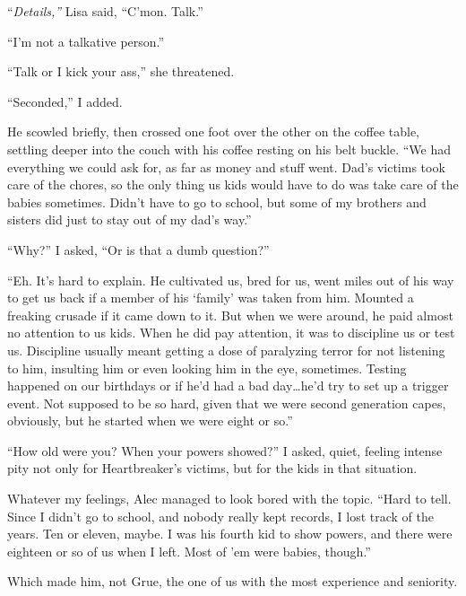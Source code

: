 ``\emph{Details,'' }Lisa said, ``C'mon.  Talk.''



``I'm not a talkative person.''



``Talk or I kick your ass,'' she threatened.



``Seconded,'' I added.



He scowled briefly, then crossed one foot over the other on the coffee table, settling deeper into the couch with his coffee resting on his belt buckle.  ``We had everything we could ask for, as far as money and stuff went.  Dad's victims took care of the chores, so the only thing us kids would have to do was take care of the babies sometimes.  Didn't have to go to school, but some of my brothers and sisters did just to stay out of my dad's way.''



``Why?'' I asked, ``Or is that a dumb question?''



``Eh.  It's hard to explain.  He cultivated us, bred for us, went miles out of his way to get us back if a member of his `family' was taken from him.  Mounted a freaking crusade if it came down to it.  But when we were around, he paid almost no attention to us kids.  When he did pay attention, it was to discipline us or test us.  Discipline usually meant getting a dose of paralyzing terror for not listening to him, insulting him or even looking him in the eye, sometimes.  Testing happened on our birthdays or if he'd had a bad day\ldots he'd try to set up a trigger event.  Not supposed to be so hard, given that we were second generation capes, obviously, but he started when we were eight or so.''



``How old were you?  When your powers showed?'' I asked, quiet, feeling intense pity not only for Heartbreaker's victims, but for the kids in that situation.



Whatever my feelings, Alec managed to look bored with the topic.  ``Hard to tell.  Since I didn't go to school, and nobody really kept records, I lost track of the years.  Ten or eleven, maybe.  I was his fourth kid to show powers, and there were eighteen or so of us when I left.  Most of 'em were babies, though.''



Which made him, not Grue, the one of us with the most experience and seniority.



